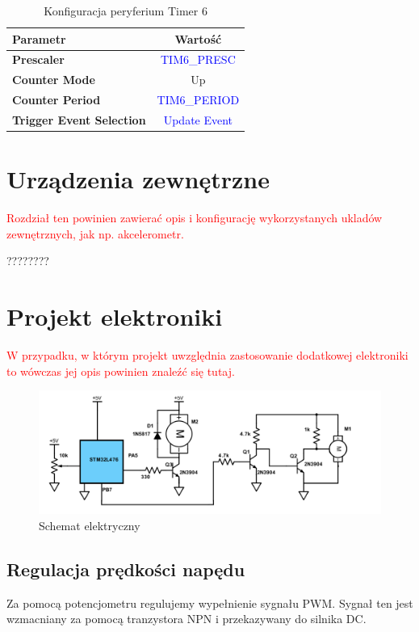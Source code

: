 \documentclass[10pt, a4paper]{article}
\begin{document}
\begin{table}[H]
	\centering
	\begin{tabular}{|l|c|} \hline
		\textbf{Parametr} & Wartość \\
		\hline
		\hline
		\textbf{Prescaler} & \textcolor{blue}{TIM6\_PRESC}\\\hline
		\textbf{Counter Mode} &  Up\\
		\hline
		\textbf{Counter Period}& \textcolor{blue}{TIM6\_PERIOD}\\\hline
		\textbf{Trigger Event Selection}& \textcolor{blue}{Update Event}\\
		\hline
	\end{tabular}
	\caption{Konfiguracja peryferium Timer 6}
	\label{tab:Timer6}
\end{table}
\section{Urządzenia zewnętrzne}
\textcolor{red}{Rozdział ten powinien zawierać opis i konfigurację wykorzystanych ukladów
	zewnętrznych, jak np. akcelerometr.}


????????

\section{Projekt elektroniki}
\textcolor{red}{W przypadku, w którym projekt uwzględnia zastosowanie 
	dodatkowej elektroniki to wówczas jej opis powinien znaleźć się tutaj.
}
	
	\begin{figure}[H]
	\centering
	\includegraphics[width=1\textwidth]{figures/schemeit-project.png}
	\caption{Schemat elektryczny}
	\label{fig:Schemat elektryczny}
\end{figure}
	
\subsection{Regulacja prędkości napędu}
Za pomocą potencjometru regulujemy wypełnienie sygnału PWM. Sygnał ten jest wzmacniany za pomocą tranzystora NPN i przekazywany do silnika DC.
\end{document}
